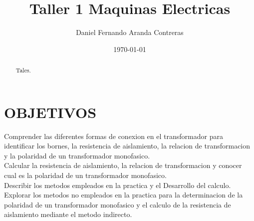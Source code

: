 \documentclass[a4paper, 12pt]{article}
\title{Taller 1 Maquinas Electricas} %
\author{Daniel Fernando Aranda Contreras} %
\date{\today} %
\begin{document}
\begin{abstract}
    Tales.
\end{abstract}

\section{OBJETIVOS }
Comprender las diferentes formas de conexion en el transformador para identificar los bornes, la resistencia de aislamiento, la relacion de transformacion y la polaridad de un transformador monofasico.
\newline
\\
Calcular la resistencia de aislamiento, la relacion de transformacion y conocer cual es la polaridad de un transformador monofasico.
\newline
\\
Describir los metodos empleados en la practica y el Desarrollo del calculo.
\newline
\\
Explorar los metodos no empleados en la practica para la determinacion de la polaridad de un transformador monofasico y el calculo de la resistencia de aislamiento mediante el metodo indirecto.
\newpage
\end{document}
